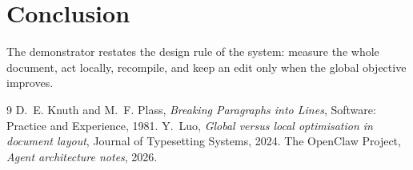 \documentclass[10pt,a4paper]{article}
\begin{document}
\section{Conclusion}
The demonstrator restates the design rule of the system: measure the whole
document, act locally, recompile, and keep an edit only when the global
objective improves.

\begin{thebibliography}{9}
 D.~E. Knuth and M.~F. Plass, \emph{Breaking Paragraphs into
Lines}, Software: Practice and Experience, 1981.
 Y.~Luo, \emph{Global versus local optimisation in document
layout}, Journal of Typesetting Systems, 2024.
 The OpenClaw Project, \emph{Agent architecture notes}, 2026.
\end{thebibliography}
\end{document}
